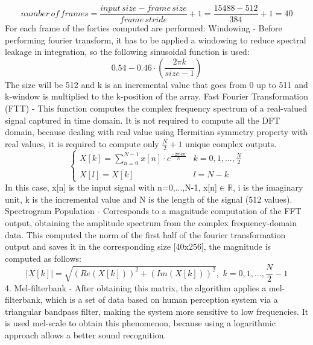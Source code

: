 \begin{equation}
    number\,of\,frames=\frac{input\,size-frame\,size}{frame\,stride}+1=\frac{15488-512}{384}+1=40
\end{equation}
For each frame of the forties computed are performed: Windowing - Before performing fourier transform, it has to be applied a windowing to reduce spectral leakage in integration, so the following sinusoidal function is used:\newline
\begin{equation}
    0.54-0.46\cdot(\frac{2\pi k}{size-1})
\end{equation}
The size will be 512 and k is an incremental value that goes from 0 up to 511 and k-window is multiplied to the k-position of the array. Fast Fourier Transformation (FTT) - This function computes the complex frequency spectrum of a real-valued signal captured in time domain. It is not required to compute all the DFT domain, because dealing with real value using Hermitian symmetry property with real values, it is required to compute only $\frac{N}{2}+1$ unique complex outputs. 
\begin{equation}
    \begin{cases} 
        X[k]=\sum_{n=0}^{N-1}x[n]\cdot e^{\frac{-2\pi ikn}{N}} & k=0,1,...,\frac{N}{2}\\
        X[l]=\overline{X[k]} & l=N-k
    \end{cases}
\end{equation}
In this case, x[n] is the input signal with n=0,...,N-1, x[n]$\in\mathbb{R}$, i is the imaginary unit, k is the incremental value and N is the length of the signal (512 values). Spectrogram Population - Corresponds to a magnitude computation of the FFT output, obtaining the amplitude spectrum from the complex frequency-domain data. This computed the norm of the first half of the fourier transformation output and saves it in the corresponding size [40x256], the magnitude is computed as follows:
\begin{equation}
    |X[k]|=\sqrt{(Re(X[k]))^2+(Im(X[k]))^2},\,\,k=0,1,...,\frac{N}{2}-1
\end{equation} 
4. Mel-filterbank - After obtaining this matrix, the algorithm applies a mel-filterbank, which is a set of data based on human perception system via a triangular bandpass filter, making the system more sensitive to low frequencies. It is used mel-scale to obtain this phenomenon, because using a logarithmic approach allows a better sound recognition.\newline
